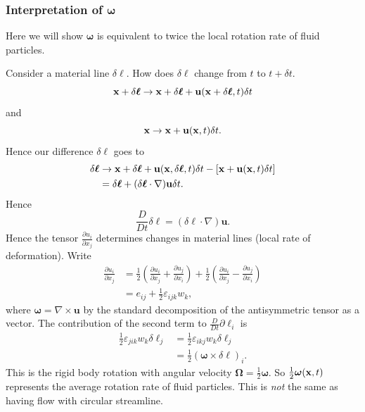 \documentclass{article}
\begin{document}
\subsubsection{Interpretation of $ \boldsymbol\omega $}
Here we will show $ \boldsymbol\omega $ is equivalent to twice the local rotation rate of fluid particles.\par
Consider a material line $ \delta\boldsymbol \ell $. How does $ \delta\boldsymbol\ell $ change from $ t $ to $ t+\delta t $.
\[
  \mathbf{x} + \delta\boldsymbol \ell \to \mathbf{x}+\delta\boldsymbol\ell + \mathbf u(\mathbf{x}+\delta\boldsymbol\ell,t) \delta t
\]
and
\[
  \mathbf{x}\to \mathbf{x} + \mathbf u(\mathbf{x},t)\delta t.
\]
Hence our difference $ \delta\boldsymbol\ell $ goes to
\begin{align*}
	\delta\boldsymbol\ell &\to \mathbf{x}+\delta\boldsymbol\ell + \mathbf u(\mathbf{x},\delta\boldsymbol\ell,t)\delta t-[\mathbf{x}+\mathbf u(\mathbf{x},t)\delta t]\\
			      &= \delta\boldsymbol\ell + (\delta\boldsymbol \ell\cdot\nabla)\mathbf u\delta t.
\end{align*}
Hence
\[
	\frac{D}{Dt}\delta\boldsymbol\ell = (\delta \boldsymbol\ell \cdot\nabla)\mathbf u.
\]
Hence the tensor $ \frac{\partial u_i}{\partial x_j} $ determines changes in material lines (local rate of deformation). Write
\begin{align*}
	\frac{\partial u_i}{\partial x_j} &= \frac 12\left(\frac{\partial u_i}{\partial x_j}+\frac{\partial u_j}{\partial x_i}\right) +\frac 12 \left(\frac{\partial u_i}{\partial x_j}-\frac{\partial u_j}{\partial x_i}\right)\\
					  &= e_{ij} +\frac 12\varepsilon_{ijk}w_k,
\end{align*}
where $ \boldsymbol\omega = \nabla\times \mathbf u $ by the standard decomposition of the antisymmetric tensor as a vector. The contribution of the second term to $ \frac D{Dt}\partial \ell_i $ is
\begin{align*}
	\frac 12 \varepsilon_{jik}w_k \delta \ell_j &= \frac 12 \varepsilon_{ikj}w_k\delta\ell_j\\
						    &=\frac 12(\boldsymbol\omega\times \delta\boldsymbol\ell)_i.
\end{align*}
This is the rigid body rotation with angular velocity $ \boldsymbol\Omega = \frac 12 \boldsymbol\omega $. So $ \frac 12\boldsymbol\omega(\mathbf{x},t) $ represents the average rotation rate of fluid particles. This is \textit{not} the same as having flow with circular streamline.
\end{document}
